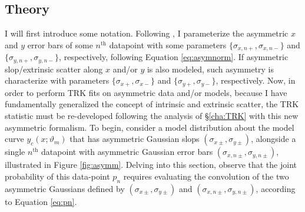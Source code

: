 \subsection{Theory}
I will first introduce some notation. Following \textcite{trotter}, I parameterize the asymmetric $x$ and $y$ error bars of some $n^\text{th}$ datapoint with some parameters $\{\sigma_{x,n+},\sigma_{x,n-}\}$ and $\{\sigma_{y,n+},\sigma_{y,n-}\}$, respectively, following Equation \eqref{eq:asymnorm}. If asymmetric slop/extrinsic scatter along $x$ and/or $y$ is also modeled, such asymmetry is characterize with parameters $\{\sigma_{x+},\sigma_{x-}\}$ and $\{\sigma_{y+},\sigma_{y-}\}$, respectively. Now, in order to perform TRK fits on asymmetric data and/or models, because I have fundamentally generalized the concept of intrinsic and extrinsic scatter, the TRK statistic must be re-developed following the analysis of \S\ref{cha:TRK} with this new asymmetric formalism. To begin, consider a model distribution about the model curve $y_c(x;\vartheta_m)$ that has asymmetric Gaussian slops $(\sigma_{x\pm},\sigma_{y\pm})$, alongside a single $n^\text{th}$ datapoint with asymmetric Gaussian error bars $(\sigma_{x,n\pm},\sigma_{y,n\pm})$, illustrated in Figure \ref{fig:asymm}. Delving into this section, observe that the joint probability of this data-point $p_n$ requires evaluating the convolution of the two asymmetric Gaussians defined by $(\sigma_{x\pm},\sigma_{y\pm})$ and $(\sigma_{x,n\pm},\sigma_{y,n\pm})$, according to Equation \ref{eq:pn}. 

